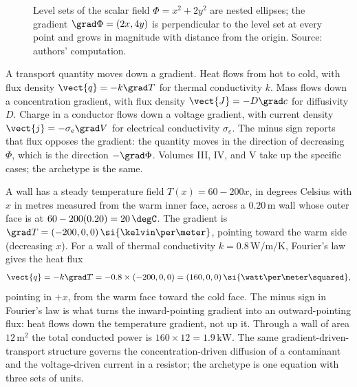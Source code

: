 \begin{figure}[h]
  \centering
  
  \caption[Gradient field of $\Phi(x, y) = x^{2} + 2 y^{2}$.]{Level
  sets of the scalar field $\Phi = x^{2} + 2 y^{2}$ are nested
  ellipses; the gradient $\grad\Phi = (2x, 4y)$ is perpendicular to
  the level set at every point and grows in magnitude with distance
  from the origin. Source: authors' computation.}
  \label{fig:vol02:ch08:gradient-field}
\end{figure}

\begin{archetype}
A transport quantity moves down a gradient. Heat flows from hot to
cold, with flux density $\vect{q} = -k \grad T$ for thermal
conductivity $k$. Mass flows down a concentration gradient, with
flux density $\vect{J} = -D\grad c$ for diffusivity $D$. Charge in
a conductor flows down a voltage gradient, with current density
$\vect{j} = -\sigma_{e}\grad V$ for electrical conductivity
$\sigma_{e}$. The minus sign reports that flux opposes the gradient:
the quantity moves in the direction of decreasing $\Phi$, which is
the direction $-\grad\Phi$. Volumes III, IV, and V take up the
specific cases; the archetype is the same.
\end{archetype}

\begin{example}
A wall has a steady temperature field $T(x) = 60 - 200x$, in degrees
Celsius with $x$ in metres measured from the warm inner face, across a
$0.20\,\si{\meter}$ wall whose outer face is at $60 - 200(0.20) =
20\,\degC$. The gradient is $\grad T = (-200, 0, 0)\,\si{\kelvin\per
\meter}$, pointing toward the warm side (decreasing $x$). For a wall
of thermal conductivity $k = 0.8\,\si{\watt\per\meter\per\kelvin}$,
Fourier's law gives the heat flux
\[
\vect{q} = -k\grad T = -0.8\times(-200, 0, 0) = (160, 0, 0)\,\si{\watt
\per\meter\squared},
\]
pointing in $+x$, from the warm face toward the cold face. The minus
sign in Fourier's law is what turns the inward-pointing gradient into
an outward-pointing flux: heat flows down the temperature gradient,
not up it. Through a wall of area $12\,\si{\meter\squared}$ the total
conducted power is $160\times 12 = 1.9\,\si{\kilo\watt}$. The same
gradient-driven-transport structure governs the concentration-driven
diffusion of a contaminant and the voltage-driven current in a
resistor; the archetype is one equation with three sets of units.
\end{example}

